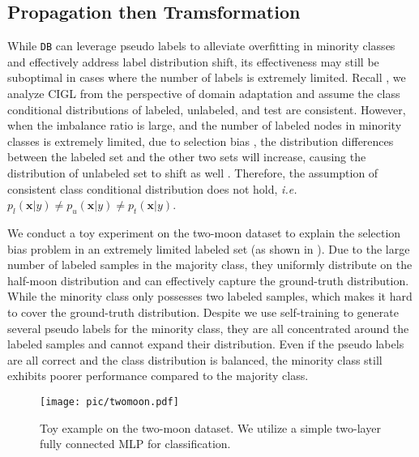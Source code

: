  
\subsection{Propagation then Tramsformation}
\label{sec:propagation}

While \texttt{DB} can leverage pseudo labels to alleviate overfitting in minority classes and effectively address label distribution shift, its effectiveness may still be suboptimal in cases where the number of labels is extremely limited. Recall , we analyze CIGL from the perspective of domain adaptation and assume the class conditional distributions of labeled, unlabeled, and test are consistent. However, when the imbalance ratio is large, and the number of labeled nodes in minority classes is extremely limited, due to selection bias \cite{xu2022alleviating}, the distribution differences between the labeled set and the other two sets will increase, causing the distribution of unlabeled set to shift as well \cite{liu2022confidence,wang2024distribution}. Therefore, the assumption of consistent class conditional distribution does not hold, \emph{i.e.} $p_l(\mathbf{x}|y)\neq p_u(\mathbf{x}|y)\neq p_t(\mathbf{x}|y)$.

We conduct a toy experiment on the two-moon dataset to explain the selection bias problem in an extremely limited labeled set (as shown in ). Due to the large number of labeled samples in the majority class, they uniformly distribute on the half-moon distribution and can effectively capture the ground-truth distribution. While the minority class only possesses two labeled samples, which makes it hard to cover the ground-truth distribution. Despite we use self-training to generate several pseudo labels for the minority class, they are all concentrated around the labeled samples and cannot expand their distribution. Even if the pseudo labels are all correct and the class distribution is balanced, the minority class still exhibits poorer performance compared to the majority class.

\begin{figure}[t]
\centering
\texttt{[image: pic/twomoon.pdf]}
\caption{Toy example on the two-moon dataset. We utilize a simple two-layer fully connected MLP for classification.}
\label{fig:twomoon}
\end{figure}

